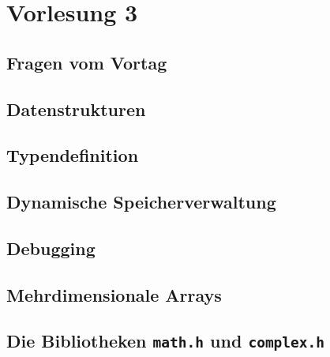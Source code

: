 \section{Vorlesung 3}

\setcounter{minutecounter}{0}

\subsection{Fragen vom Vortag}

\iflecturer
\begin{framed}
\end{framed}
\fi

\subsection{Datenstrukturen}

\iflecturer
\begin{framed}
\end{framed}
\fi

\subsection{Typendefinition}

\iflecturer
\begin{framed}
\end{framed}
\fi

\subsection{Dynamische Speicherverwaltung}

\iflecturer
\begin{framed}
\end{framed}
\fi

\subsection{Debugging}

\iflecturer
\begin{framed}
\end{framed}
\fi

\subsection{Mehrdimensionale Arrays}

\iflecturer
\begin{framed}
\end{framed}
\fi

\subsection{Die Bibliotheken \texttt{math.h} und \texttt{complex.h}}

\iflecturer
\begin{framed}
\end{framed}
\fi